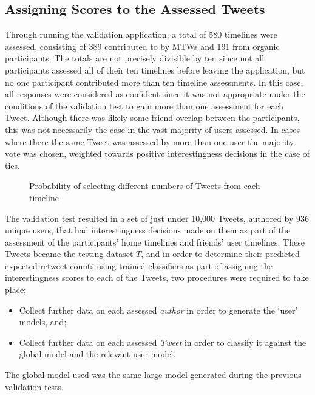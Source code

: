 \subsection{Assigning Scores to the Assessed Tweets}
Through running the validation application, a total of 580 timelines were assessed, consisting of 389 contributed to by MTWs and 191 from organic participants. The totals are not precisely divisible by ten since not all participants assessed all of their ten timelines before leaving the application, but no one participant contributed more than ten timeline assessments. In this case, all responses were considered as confident since it was not appropriate under the conditions of the validation test to gain more than one assessment for each Tweet. Although there was likely some friend overlap between the participants, this was not necessarily the case in the vast majority of users assessed. In cases where there the same Tweet was assessed by more than one user the majority vote was chosen, weighted towards positive interestingness decisions in the case of ties. 

\begin{figure}[h]
\centering
{}
\caption{Probability of selecting different numbers of Tweets from each timeline}
\label{fig:num_tweets_selected}

\end{figure}
The validation test resulted in a set of just under 10,000 Tweets, authored by 936 unique users, that had interestingness decisions made on them as part of the assessment of the participants' home timelines and friends' user timelines. These Tweets became the testing dataset $T$, and in order to determine their predicted expected retweet counts using trained classifiers as part of assigning the interestingness scores to each of the Tweets, two procedures were required to take place;
\begin{itemize}
    \item Collect further data on each assessed \textit{author} in order to generate the `user' models, and;
    \item Collect further data on each assessed \textit{Tweet} in order to classify it against the global model and the relevant user model.
\end{itemize}
The global model used was the same large model generated during the previous validation tests.

